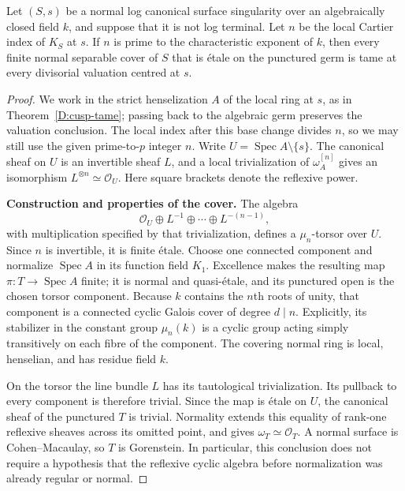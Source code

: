\begin{theorem}
\label{D:prime-to-p-index-tame}
Let $(S,s)$ be a normal log canonical surface singularity
over an algebraically closed field $k$, and suppose that it
is not log terminal.  Let $n$ be the local Cartier index of
$K_S$ at $s$.  If $n$ is prime to the characteristic exponent
of $k$, then every finite normal separable cover of $S$
that is \'etale on the punctured germ is tame at every
divisorial valuation centred at $s$.
\end{theorem}
\begin{proof}
We work in the strict henselization $A$ of the local ring
at $s$, as in Theorem~\ref{D:cusp-tame}; passing back to
the algebraic germ preserves the valuation conclusion.
The local index after this base change divides $n$, so
we may still use the given prime-to-$p$ integer $n$.
Write $U=\operatorname{Spec}A\setminus\{s\}$.
The canonical sheaf on $U$ is an invertible sheaf $L$,
and a local trivialization of $\omega_A^{[n]}$ gives
an isomorphism $L^{\otimes n}\simeq\mathcal O_U$.
Here square brackets denote the reflexive power.

\par\smallskip\noindent\textbf{Construction and properties of the cover.}\quad
The algebra
\[
 \mathcal O_U\oplus L^{-1}\oplus\cdots\oplus L^{-(n-1)},
\]
with multiplication specified by that trivialization,
defines a $\mu_n$-torsor over $U$.  Since $n$ is invertible,
it is finite \'etale.  Choose one connected component and
normalize $\operatorname{Spec}A$ in its function field
$K_1$.  Excellence makes the resulting map
$\pi:T\to\operatorname{Spec}A$ finite; it is normal and
quasi-\'etale, and its punctured open is the chosen torsor
component.  Because $k$ contains the $n$th roots of unity,
that component is a connected cyclic Galois cover of
degree $d\mid n$.  Explicitly, its stabilizer in the
constant group $\mu_n(k)$ is a cyclic group acting
simply transitively on each fibre of the component.
The covering normal ring is local, henselian, and has
residue field $k$.

On the torsor the line bundle $L$ has its tautological
trivialization.  Its pullback to every component is
therefore trivial.  Since the map is \'etale on $U$,
the canonical sheaf of the punctured $T$ is trivial.
Normality extends this equality of rank-one reflexive
sheaves across its omitted point, and gives
$\omega_T\simeq\mathcal O_T$.  A normal surface is
Cohen--Macaulay, so $T$ is Gorenstein.  In particular,
this conclusion does not require a hypothesis that
the reflexive cyclic algebra before normalization
was already regular or normal.


\end{proof}
